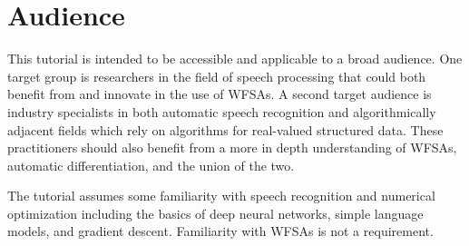 \documentclass[11pt]{article}
\begin{document}
\section*{Audience}

This tutorial is intended to be accessible and applicable to a broad audience.
One target group is researchers in the field of speech processing that could
both benefit from and innovate in the use of WFSAs. A second target audience is
industry specialists in both automatic speech recognition and algorithmically
adjacent fields which rely on algorithms for real-valued structured data. These
practitioners should also benefit from a more in depth understanding of WFSAs,
automatic differentiation, and the union of the two.

The tutorial assumes some familiarity with speech recognition and numerical
optimization including the basics of deep neural networks, simple language
models, and gradient descent. Familiarity with WFSAs is not a requirement.



\end{document}

